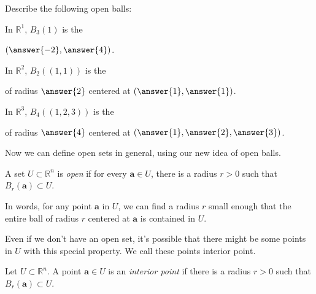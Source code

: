 \documentclass{ximera}
\begin{document}
\begin{example}
\begin{foldable}
Describe the following open balls:

In $\mathbb{R}^1$, $B_3(1)$ is the 
\begin{multipleChoice}
\end{multipleChoice}
 $(\answer{-2},\answer{4})$.
 
 In $\mathbb{R}^2$, $B_2((1,1))$ is the
 \begin{multipleChoice}
\end{multipleChoice}
of radius $\answer{2}$ centered at $(\answer{1}, \answer{1})$.

In $\mathbb{R}^3$, $B_4((1,2,3))$ is the
\begin{multipleChoice}
\end{multipleChoice}
of radius $\answer{4}$ centered at $(\answer{1}, \answer{2}, \answer{3})$.
\end{foldable}
\end{example}

Now we can define open sets in general, using our new idea of open balls.

\begin{definition}
A set $U\subset \mathbb{R}^n$ is \emph{open} if for every $\mathbf{a}\in U$, there is a radius $r>0$ such that $B_r(\mathbf{a})\subset U$.
\end{definition}

In words, for any point $\mathbf{a}$ in $U$, we can find a radius $r$ small enough that the entire ball of radius $r$ centered at $\mathbf{a}$ is contained in $U$.


Even if we don't have an open set, it's possible that there might be some points in $U$ with this special property. We call these points interior point.

\begin{definition}
Let $U\subset \mathbb{R}^n$. A point $\mathbf{a}\in U$ is an \emph{interior point} if there is a radius $r>0$ such that $B_r(\mathbf{a})\subset U$.
\end{definition}
\end{document}
